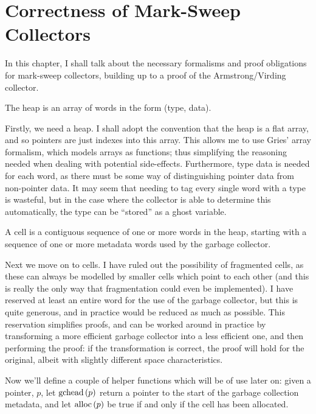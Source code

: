 \chapter{Correctness of Mark-Sweep Collectors}
\label{sec:marksweep}

In this chapter, I shall talk about the necessary formalisms and proof
obligations for \gls{mark-sweep} \glspl{collector}, building up to a
proof of the Armstrong/Virding\cite{Armstrong95} \gls{collector}.

\begin{definition}[Heap]
  \label{def:ms-heap}
  The heap is an array of words in the form (type, data).
\end{definition}

Firstly, we need a \gls{heap}. I shall adopt the convention that the
\gls{heap} is a flat array, and so \glspl{pointer} are just indexes
into this array. This allows me to use Gries' array
formalism\cite{Gries87}, which models arrays as functions; thus
simplifying the reasoning needed when dealing with potential
side-effects. Furthermore, type data is needed for each word, as there
must be some way of distinguishing \gls{pointer} data from non-pointer
data. It may seem that needing to tag every single word with a type is
wasteful, but in the case where the \gls{collector} is able to
determine this automatically, the type can be ``stored'' as a ghost
variable.

\begin{definition}[Cell]
  \label{def:ms-cell}
  A cell is a contiguous sequence of one or more words in the heap,
  starting with a sequence of one or more metadata words used by the
  garbage collector.
\end{definition}

Next we move on to \glspl{cell}. I have ruled out the possibility of
fragmented \glspl{cell}, as these can always be modelled by smaller
\glspl{cell} which point to each other (and this is really the only
way that fragmentation could even be implemented). I have reserved at
least an entire word for the use of the \gls{garbage collector}, but
this is quite generous, and in practice would be reduced as much as
possible. This reservation simplifies proofs, and can be worked around
in practice by transforming a more efficient \gls{garbage collector}
into a less efficient one, and then performing the proof: if the
transformation is correct, the proof will hold for the original,
albeit with slightly different space characteristics.

Now we'll define a couple of helper functions which will be of use
later on: given a \gls{pointer}, $p$, let $\mathrm{gchead}\left(p\right)$ return a
pointer to the start of the \gls{garbage collection} metadata, and let
$\mathrm{alloc}\left(p\right)$ be true if and only if the \gls{cell} has been allocated.

